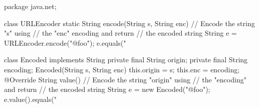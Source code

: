 \documentclass{article}
\begin{document}
\begin{lnSnippet}
package java.net;

class URLEncoder {
  static String encode(String s, String enc) {
    // Encode the string "s" using
    // the "enc" encoding and return
    // the encoded string
  }
}
String e = URLEncoder.encode("@foo");
e.equals("%
\end{lnSnippet}
\begin{lnSnippet}
class Encoded implements String {
  private final String origin;
  private final String encoding;
  Encoded(String s, String enc) {
    this.origin = s;
    this.enc = encoding;
  }
  @Override String value() {
    // Encode the string "origin" using
    // the "encoding" and return
    // the encoded string
  }
}
String e = new Encoded("@foo");
e.value().equals("%
\end{lnSnippet}
\end{document}
